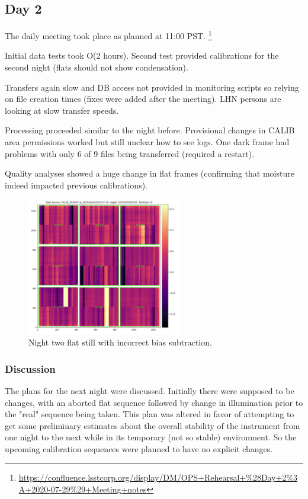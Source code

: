 \subsection{Day 2} \label{sec:day2}

The daily meeting took place as planned at 11:00 PST. \footnote{\url{https://confluence.lsstcorp.org/display/DM/OPS+Rehearsal+\%28Day+2\%3A+2020-07-29\%29+Meeting+notes}}

Initial data tests took O(2 hours).  Second test provided calibrations for the
second night (flats should not show condensation).

Transfers again slow and DB access not provided in monitoring scripts so
relying on file creation times (fixes were added after the meeting).  LHN
persons are looking at slow transfer speeds.

Processing proceeded similar to the night before.  Provisional changes in
CALIB area permissions worked but still unclear how to see logs.  One dark frame
had problems with only 6 of 9 files being transferred (required a restart).

Quality analyses showed a huge change in flat frames (confirming that
moisture indeed impacted previous calibrations).


\begin{figure}
\begin{center}
\includegraphics[width=0.6\textwidth]{figures/n2bad}
\end{center}
\caption{Night two flat still with incorrect bias subtraction.\label{fig:d2}}
\end{figure}

\subsubsection{Discussion}

The plans for the next night were discussed.  Initially there were supposed to be
changes, with an aborted flat sequence followed by change in illumination prior to
the "real" sequence being taken.  This plan was altered in favor of attempting to
get some preliminary estimates about the overall stability of the instrument from
one night to the next while in its temporary (not so stable) environment.  So the
upcoming calibration sequences were planned to have no explicit changes.


